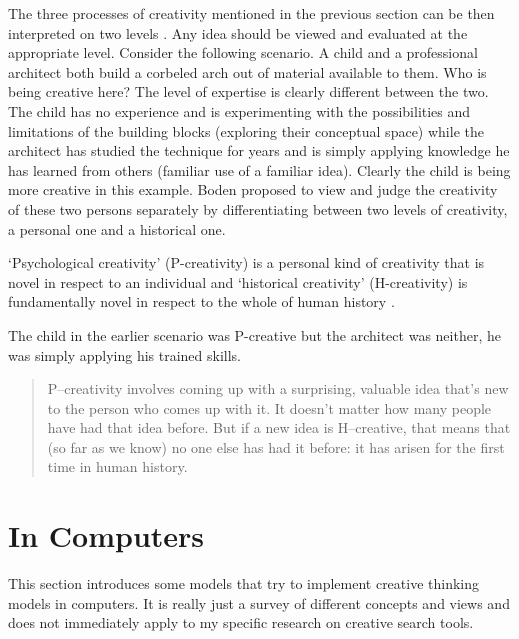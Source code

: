 The three processes of creativity mentioned in the previous section can be then interpreted on two levels \autocite{Boden2003}. Any idea should be viewed and evaluated at the appropriate level. Consider the following scenario. A child and a professional architect both build a corbeled arch out of material available to them. Who is being creative here? The level of expertise is clearly different between the two. The child has no experience and is experimenting with the possibilities and limitations of the building blocks (exploring their conceptual space) while the architect has studied the technique for years and is simply applying knowledge he has learned from others (familiar use of a familiar idea). Clearly the child is being more creative in this example. Boden proposed to view and judge the creativity of these two persons separately by differentiating between two levels of creativity, a personal one and a historical one. 

`Psychological creativity' (P-creativity) is a personal kind of creativity that is novel in respect to an individual and `historical creativity' (H-creativity) is fundamentally novel in respect to the whole of human history \autocite{Boden2003}. 

The child in the earlier scenario was P-creative but the architect was neither, he was simply applying his trained skills.

\begin{quotation}
	P–creativity involves coming up with a surprising, valuable idea that's new to the person who comes up with it. It doesn't matter how many people have had that idea before. But if a new idea is H–creative, that means that (so far as we know) no one else has had it before: it has arisen for the first time in human history. 
\end{quotation}


\section{In Computers}
\label{s:compcreativity}

This section introduces some models that try to implement creative thinking models in computers. It is really just a survey of different concepts and views and does not immediately apply to my specific research on creative search tools.

